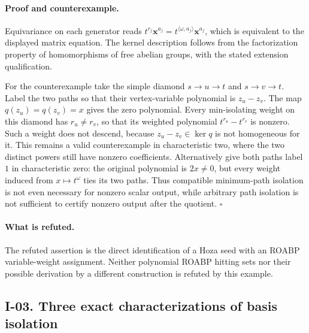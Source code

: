 \documentclass[11pt,a4paper]{article}
\theoremstyle{definition}\newtheorem{definition}{Definition}
\begin{document}
\paragraph{Proof and counterexample.}
Equivariance on each generator reads
$t^{r_j}\mathbf x^{a_j}=t^{\langle\omega,a_j\rangle}\mathbf x^{a_j}$,
which is equivalent to the displayed matrix equation.  The kernel
description follows from the factorization property of homomorphisms
of free abelian groups, with the stated extension qualification.

For the counterexample take the simple diamond
$s\to u\to t$ and $s\to v\to t$.  Label the two paths so that their
vertex-variable polynomial is $z_u-z_v$.  The map $q(z_u)=q(z_v)=x$
gives the zero polynomial.  Every min-isolating weight on this diamond
has $r_u\ne r_v$, so that its weighted polynomial
$t^{r_u}-t^{r_v}$ is nonzero.  Such a weight does not descend, because
$z_u-z_v\in\ker q$ is not homogeneous for it.  This remains a valid
counterexample in characteristic two, where the two distinct powers
still have nonzero coefficients.  Alternatively give both paths label
$1$ in characteristic zero: the original polynomial is $2x\ne0$,
but every weight induced from $x\mapsto t^{\omega}$ ties its two paths.
Thus compatible minimum-path isolation is not even necessary for
nonzero scalar output, while arbitrary path isolation is not sufficient
to certify nonzero output after the quotient. \hfill$\square$

\paragraph{What is refuted.}
The refuted assertion is the direct identification of a Hoza seed with
an ROABP variable-weight assignment.  Neither polynomial ROABP hitting
sets nor their possible derivation by a different construction is
refuted by this example.

\subsection{I-03. Three exact characterizations of basis isolation}
\label{I-03}
\end{document}

